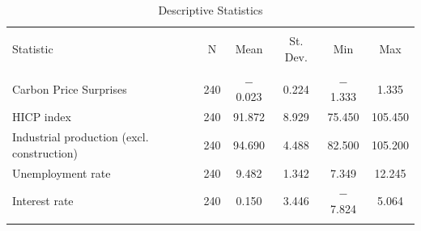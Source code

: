 
\begin{table}[!htbp] \centering 
  \caption{Descriptive Statistics} 
  \label{} 
\begin{tabular}{@{\extracolsep{5pt}}lccccc} 
\\[-1.8ex]\hline 
\hline \\[-1.8ex] 
Statistic & \multicolumn{1}{c}{N} & \multicolumn{1}{c}{Mean} & \multicolumn{1}{c}{St. Dev.} & \multicolumn{1}{c}{Min} & \multicolumn{1}{c}{Max} \\ 
\hline \\[-1.8ex] 
Carbon Price Surprises & 240 & $-$0.023 & 0.224 & $-$1.333 & 1.335 \\ 
HICP index & 240 & 91.872 & 8.929 & 75.450 & 105.450 \\ 
Industrial production (excl. construction) & 240 & 94.690 & 4.488 & 82.500 & 105.200 \\ 
Unemployment rate & 240 & 9.482 & 1.342 & 7.349 & 12.245 \\ 
Interest rate & 240 & 0.150 & 3.446 & $-$7.824 & 5.064 \\ 
\hline \\[-1.8ex] 
\end{tabular} 
\end{table} 
